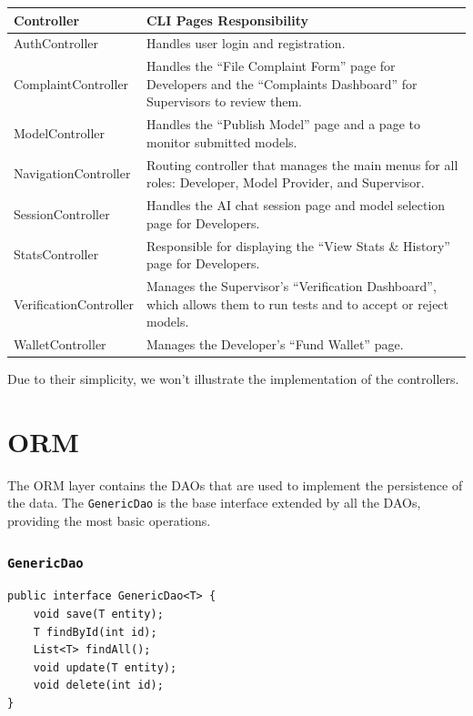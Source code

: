 \documentclass[a4paper,11pt]{report}
\begin{document}
    \vspace{0.3cm}
    \begin{table}[H]
        \centering
        \renewcommand{\arraystretch}{1.5}
        \begin{tabularx}{\textwidth}{|>{\ttfamily}l|X|}
            \hline
            \textbf{\textsf{Controller}} & \textbf{\textsf{CLI Pages Responsibility}} \\
            \hline
            AuthController & Handles user login and registration. \\
            \hline
            ComplaintController & Handles the \enquote{File Complaint Form} page for Developers and the \enquote{Complaints Dashboard} for Supervisors to review them. \\
            \hline
            ModelController & Handles the \enquote{Publish Model} page and a page to monitor submitted models. \\
            \hline
            NavigationController & Routing controller that manages the main menus for all roles: Developer, Model Provider, and Supervisor. \\
            \hline
            SessionController & Handles the AI chat session page and model selection page for Developers. \\
            \hline
            StatsController & Responsible for displaying the \enquote{View Stats \& History} page for Developers. \\
            \hline
            VerificationController & Manages the Supervisor's \enquote{Verification Dashboard}, which allows them to run tests and to accept or reject models.  \\
            \hline
            WalletController & Manages the Developer's \enquote{Fund Wallet} page. \\
            \hline
        \end{tabularx}
    \end{table}
    Due to their simplicity, we won't illustrate the implementation of the controllers.
    \section{ORM}
    The ORM layer contains the DAOs that are used to implement the persistence of the data. The \texttt{GenericDao} is the base interface extended by all the DAOs, providing the most basic operations.

    \subsubsection{\texttt{GenericDao}}
    \begin{lstlisting}[label={lst:genericdao}]
public interface GenericDao<T> {
	void save(T entity);
	T findById(int id);
	List<T> findAll();
	void update(T entity);
	void delete(int id);
}
    \end{lstlisting}
\end{document}
